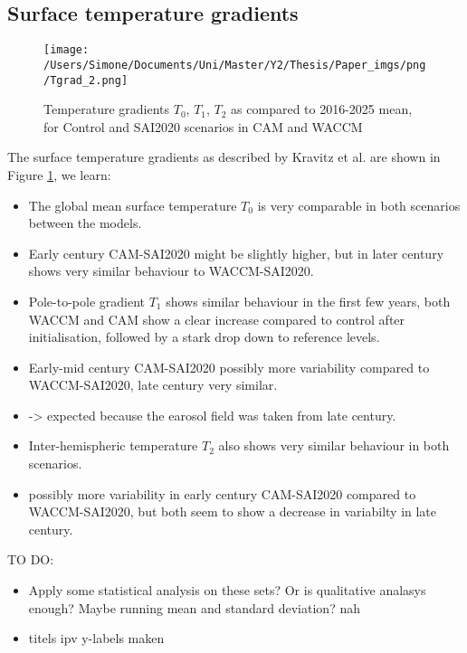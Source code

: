 \subsection{Surface temperature gradients}

\begin{figure}[H]
	\centering
	\texttt{[image: /Users/Simone/Documents/Uni/Master/Y2/Thesis/Paper\_imgs/png/Tgrad\_2.png]}
	\caption{Temperature gradients $T_0$, $T_1$, $T_2$ as compared to 2016-2025 mean, for Control and SAI2020 scenarios in CAM and WACCM}
	\label{fig:Tgrad}
\end{figure}

The surface temperature gradients as described by Kravitz et al. are shown in Figure \ref{fig:Tgrad}, we learn:
\begin{itemize}
	\item The global mean surface temperature $T_0$ is very comparable in both scenarios between the models.
	\item Early century CAM-SAI2020 might be slightly higher, but in later century shows very similar behaviour to WACCM-SAI2020.
	\item Pole-to-pole gradient $T_1$ shows similar behaviour in the first few years, both WACCM and CAM show a clear increase compared to control after initialisation, followed by a stark drop down to reference levels. 
	\item Early-mid century CAM-SAI2020 possibly more variability compared to WACCM-SAI2020, late century very similar.
	\item -> expected because the earosol field was taken from late century.
	\item Inter-hemispheric temperature $T_2$ also shows very similar behaviour in both scenarios. 
	\item possibly more variability in early century CAM-SAI2020 compared to WACCM-SAI2020, but both seem to show a decrease in variabilty in late century. 
\end{itemize}

TO DO:
\begin{itemize}
	\item Apply some statistical analysis on these sets? Or is qualitative analasys enough? Maybe running mean and standard deviation? nah
	\item titels ipv y-labels maken 
\end{itemize}